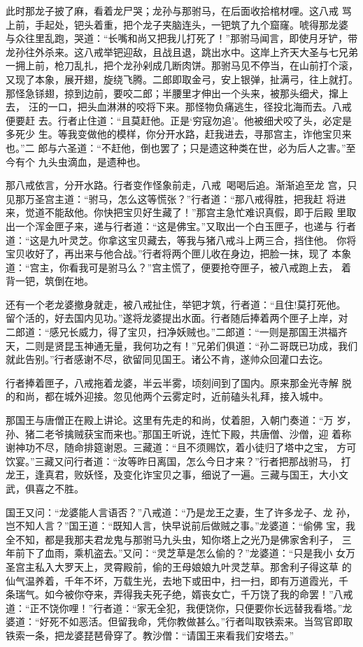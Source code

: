 此时那龙子披了麻，看着龙尸哭；龙孙与那驸马，在后面收拾棺材哩。这八戒
骂上前，手起处，钯头着重，把个龙子夹脑连头，一钯筑了九个窟窿。唬得那龙婆
与众往里乱跑，哭道：“长嘴和尚又把我儿打死了！”那驸马闻言，即使月牙铲，带
龙孙往外杀来。这八戒举钯迎敌，且战且退，跳出水中。这岸上齐天大圣与七兄弟
一拥上前，枪刀乱扎，把个龙孙剁成几断肉饼。那驸马见不停当，在山前打个滚，
又现了本象，展开翅，旋绕飞腾。二郎即取金弓，安上银弹，扯满弓，往上就打。
那怪急铩翅，掠到边前，要咬二郎；半腰里才伸出一个头来，被那头细犬，撺上去，
汪的一口，把头血淋淋的咬将下来。那怪物负痛逃生，径投北海而去。八戒便要赶
去。行者止住道：“且莫赶他。正是‘穷寇勿追’。他被细犬咬了头，必定是多死少
生。等我变做他的模样，你分开水路，赶我进去，寻那宫主，诈他宝贝来也。”二
郎与六圣道：“不赶他，倒也罢了；只是遗这种类在世，必为后人之害。”至今有个
九头虫滴血，是遗种也。

那八戒依言，分开水路。行者变作怪象前走，八戒喝喝后追。渐渐追至龙
宫，只见那万圣宫主道：“驸马，怎么这等慌张？”行者道：“那八戒得胜，把我赶
将进来，觉道不能敌他。你快把宝贝好生藏了！”那宫主急忙难识真假，即于后殿
里取出一个浑金匣子来，递与行者道：“这是佛宝。”又取出一个白玉匣子，也递与
行者道：“这是九叶灵芝。你拿这宝贝藏去，等我与猪八戒斗上两三合，挡住他。
你将宝贝收好了，再出来与他合战。”行者将两个匣儿收在身边，把脸一抹，现了
本象道：“宫主，你看我可是驸马么？”宫主慌了，便要抢夺匣子，被八戒跑上去，
着背一钯，筑倒在地。

还有一个老龙婆撤身就走，被八戒扯住，举钯才筑，行者道：“且住!莫打死他。
留个活的，好去国内见功。”遂将龙婆提出水面。行者随后捧着两个匣子上岸，对
二郎道：“感兄长威力，得了宝贝，扫净妖贼也。”二郎道：“一则是那国王洪福齐
天，二则是贤昆玉神通无量，我何功之有！”兄弟们俱道：“孙二哥既已功成，我们
就此告别。”行者感谢不尽，欲留同见国王。诸公不肯，遂帅众回灌口去讫。

行者捧着匣子，八戒拖着龙婆，半云半雾，顷刻间到了国内。原来那金光寺解
脱的和尚，都在城外迎接。忽见他两个云雾定时，近前磕头礼拜，接入城中。

那国王与唐僧正在殿上讲论。这里有先走的和尚，仗着胆，入朝门奏道：“万
岁，孙、猪二老爷擒贼获宝而来也。”那国王听说，连忙下殿，共唐僧、沙僧，迎
着称谢神功不尽，随命排筵谢恩。三藏道：“且不须赐饮，着小徒归了塔中之宝，
方可饮宴。”三藏又问行者道：“汝等昨日离国，怎么今日才来？”行者把那战驸马，
打龙王，逢真君，败妖怪，及变化诈宝贝之事，细说了一遍。三藏与国王，大小文
武，俱喜之不胜。

国王又问：“龙婆能人言语否？”八戒道：“乃是龙王之妻，生了许多龙子、龙
孙，岂不知人言？”国王道：“既知人言，快早说前后做贼之事。”龙婆道：“偷佛
宝，我全不知，都是我那夫君龙鬼与那驸马九头虫，知你塔上之光乃是佛家舍利子，
三年前下了血雨，乘机盗去。”又问：“灵芝草是怎么偷的？”龙婆道：“只是我小
女万圣宫主私入大罗天上，灵霄殿前，偷的王母娘娘九叶灵芝草。那舍利子得这草
的仙气温养着，千年不坏，万载生光，去地下或田中，扫一扫，即有万道霞光，千
条瑞气。如今被你夺来，弄得我夫死子绝，婿丧女亡，千万饶了我的命罢！”八戒
道：“正不饶你哩！”行者道：“家无全犯，我便饶你，只便要你长远替我看塔。”龙
婆道：“好死不如恶活。但留我命，凭你教做甚么。”行者叫取铁索来。当驾官即取
铁索一条，把龙婆琵琶骨穿了。教沙僧：“请国王来看我们安塔去。”

